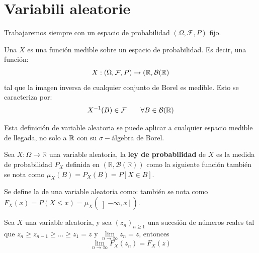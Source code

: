 \section{Variabili aleatorie}

\begin{observacion}
    Trabajaremos siempre con un espacio de probabilidad $(\Omega, \mathcal{F}, P)$ fijo.
\end{observacion}

\begin{definicion}
    Una  $X$ es una función medible sobre un espacio de probabilidad. Es decir, una función:
    $$X:(\Omega, \mathcal{F}, P) \rightarrow (\mathbb{R}, \mathcal{B}(\mathbb{R})$$
    tal que la imagen inversa de cualquier conjunto de Borel es medible. Esto se caracteriza por:
    $$X^{-1}(B) \in \mathcal{F} \qquad \forall B \in \mathcal{B}(\mathbb{R})$$
\end{definicion}

\begin{observacion}
    Esta definición de variable aleatoria se puede aplicar a cualquier espacio medible de llegada, no solo a $\mathbb{R}$ con su $\sigma-$álgebra de Borel.
\end{observacion}

\begin{definicion}
    Sea $X:\Omega \to \mathbb{R}$ una variable aleatoria, la \textbf{ley de probabilidad} de $X$ es la medida de probabilidad $P_X$ definida en $(\mathbb{R}, \mathcal{B}(\mathbb{R}))$ como la siguiente función
    también se nota como $\mu_X(B)=P_X(B)= P[X\in B]$.
\end{definicion}

\begin{definicion}
    Se define la  de una variable aleatoria como:
    \Func{F_X}{\R}{[0,1]}{x}{P_X\left(]-\infty, x]\right)}
    también se nota como $F_X(x)=P(X\leq x)=\mu_X(\left]-\infty, x\right])$.
\end{definicion}

\begin{coro}
    Sea $X$ una variable aleatoria, y sea $(z_n)_{n\geq 1}$ una sucesión de números reales tal que $z_n \geq z_{n-1} \geq \dots\geq z_1=z$ y $\lim\limits_{n\to \infty} z_n = z$, entonces
    \begin{equation*}
        \lim_{n\to \infty} F_X(z_n) = F_X(z)
    \end{equation*}
\end{coro}

